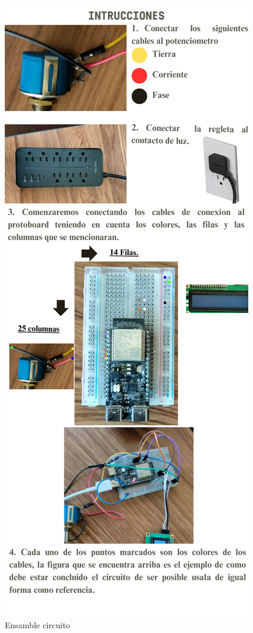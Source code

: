     \begin{figure}
        \centering
     \includegraphics[scale=0.150]{24/Img/circuitoElectricoinstructivo.pdf}
        \caption{Ensamble circuito}
        \label{fig:enter-label}
    \end{figure}

